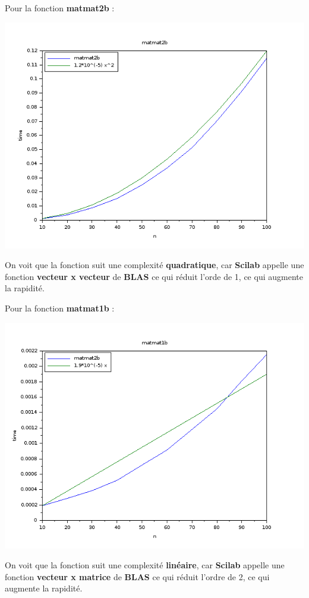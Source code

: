 \documentclass{article}
\begin{document}
Pour la fonction \textbf{matmat2b} :

\includegraphics[scale=0.5]{img/matmat2b.png}

On voit que la fonction suit une complexité \textbf{quadratique}, car
\textbf{Scilab} appelle une fonction \textbf{vecteur x vecteur} de
\textbf{BLAS} ce qui réduit l'orde de 1, ce qui augmente la
rapidité. \newline

Pour la fonction \textbf{matmat1b} :

\includegraphics[scale=0.5]{img/matmat1b.png}

On voit que la fonction suit une complexité \textbf{linéaire}, car
\textbf{Scilab} appelle une fonction \textbf{vecteur x matrice} de
\textbf{BLAS} ce qui réduit l'ordre de 2, ce qui augmente la
rapidité. \newline
\end{document}
